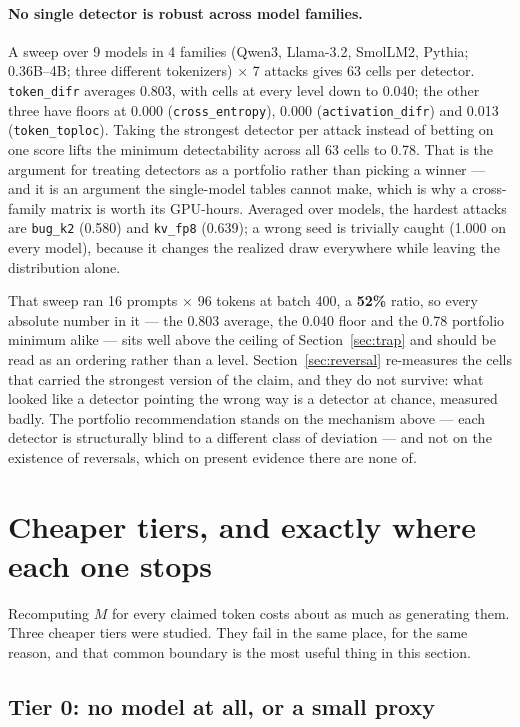 \documentclass[11pt]{article}
\newcommand{\td}{\texttt{token\_difr}}
\newcommand{\ce}{\texttt{cross\_entropy}}
\newcommand{\ad}{\texttt{activation\_difr}}
\newcommand{\tl}{\texttt{token\_toploc}}
\begin{document}
\paragraph{No single detector is robust across model families.} A sweep over 9 models
in 4 families (Qwen3, Llama-3.2, SmolLM2, Pythia; 0.36B--4B; three different
tokenizers) $\times$ 7 attacks gives 63 cells per detector. \td{} averages 0.803, with
cells at every level down to 0.040; the other three have floors at 0.000 (\ce{}),
0.000 (\ad{}) and 0.013 (\tl{}). Taking the strongest detector per attack instead of
betting on one score lifts the minimum detectability across all 63 cells to 0.78.
That is the argument for treating detectors as a portfolio rather than picking a
winner --- and it is an argument the single-model tables cannot make, which is why a
cross-family matrix is worth its GPU-hours. Averaged over models, the hardest attacks
are \texttt{bug\_k2} (0.580) and \texttt{kv\_fp8} (0.639); a wrong seed is trivially
caught (1.000 on every model), because it changes the realized draw everywhere while
leaving the distribution alone.

That sweep ran 16 prompts $\times$ 96 tokens at batch 400, a \textbf{52\%} ratio, so
every absolute number in it --- the 0.803 average, the 0.040 floor and the 0.78
portfolio minimum alike --- sits well above the ceiling of Section~\ref{sec:trap} and
should be read as an ordering rather than a level. Section~\ref{sec:reversal}
re-measures the cells that carried the strongest version of the claim, and they do not
survive: what looked like a detector pointing the wrong way is a detector at chance,
measured badly. The portfolio recommendation stands on the mechanism above --- each
detector is structurally blind to a different class of deviation --- and not on the
existence of reversals, which on present evidence there are none of.

\section{Cheaper tiers, and exactly where each one stops}
\label{sec:cheap}

Recomputing $M$ for every claimed token costs about as much as generating them. Three
cheaper tiers were studied. They fail in the same place, for the same reason, and that
common boundary is the most useful thing in this section.

\subsection{Tier 0: no model at all, or a small proxy}
\end{document}
